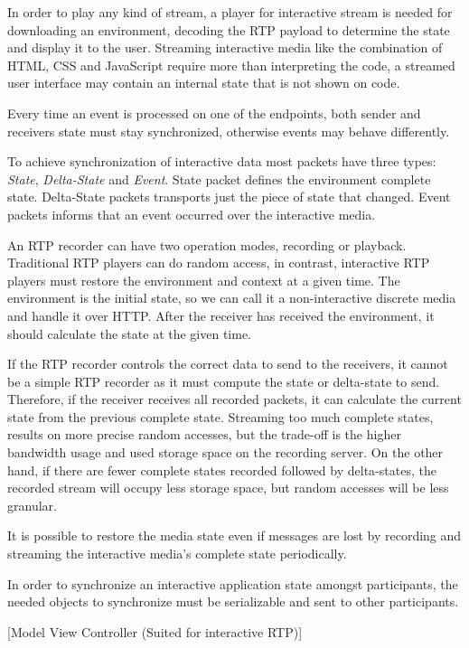 	In order to play any kind of stream, a player for interactive stream is needed for downloading an environment, decoding the \ac{RTP} payload to determine the state and display it to the user. Streaming interactive media like the combination of \ac{HTML}, \ac{CSS} and JavaScript require more than interpreting the code, a streamed user interface may contain an internal state that is not shown on code.

	Every time an event is processed on one of the endpoints, both sender and receivers state must stay synchronized, otherwise events may behave differently.

	To achieve synchronization of interactive data most packets have three types: \emph{State}, \emph{Delta-State} and \emph{Event}. State packet defines the environment complete state. Delta-State packets transports just the piece of state that changed. Event packets informs that an event occurred over the interactive media. 


	An \ac{RTP} recorder can have two operation modes, recording or playback. Traditional \ac{RTP} players can do random access, in contrast, interactive \ac{RTP} players must restore the environment and context at a given time. The environment is the initial state, so we can call it a non-interactive discrete media and handle it over \ac{HTTP}. After the receiver has received the environment, it should calculate the state at the given time. 

	If the \ac{RTP} recorder controls the correct data to send to the receivers, it cannot be a simple \ac{RTP} recorder as it must compute the state or delta-state to send. Therefore, if the receiver receives all recorded packets, it can calculate the current state from the previous complete state. Streaming too much complete states, results on more precise random accesses, but the trade-off is the higher bandwidth usage and used storage space on the recording server. On the other hand, if there are fewer complete states recorded followed by delta-states, the recorded stream will occupy less storage space, but random accesses will be less granular.

	It is possible to restore the media state even if messages are lost by recording and streaming the interactive media's complete state periodically.

	In order to synchronize an interactive application state amongst participants, the needed objects to synchronize must be serializable and sent to other participants.

  {\color{fade}[Model View Controller (Suited for interactive RTP)]}

